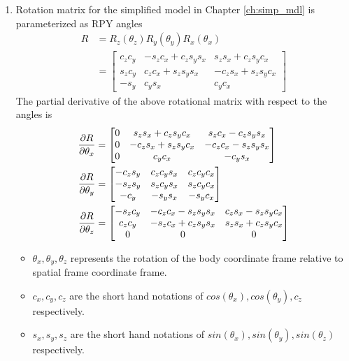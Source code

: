 \begin{enumerate}
\item Rotation matrix for the simplified model in Chapter \ref{ch:simp_mdl} is parameterized as RPY angles
\begin{equation}
	\label{eq:rot_simp}
	\begin{split}
		R &= R_z(\theta_z) R_y(\theta_y) R_x(\theta_x)\\ &=
		\begin{bmatrix}
		c_zc_y &-s_zc_x+c_zs_ys_x &s_zs_x+c_zs_yc_x\\
		s_zc_y &c_zc_x+s_zs_ys_x &-c_zs_x+s_zs_yc_x\\
		-s_y &c_ys_x &c_yc_x
		\end{bmatrix}
	\end{split}
\end{equation}
The partial derivative of the above rotational matrix with respect to the angles is
\begin{equation}
	\begin{split}	
		\frac{\partial {R}}{\partial {\theta_x}} &=
		\begin{bmatrix}
		0 &s_zs_x+c_zs_yc_x &s_zc_x-c_zs_ys_x \\
		0 &-c_zs_x+s_zs_yc_x &-c_zc_x-s_zs_ys_x \\
		0 &c_yc_x &-c_ys_x
		\end{bmatrix}\\
		\frac{\partial {R}}{\partial {\theta_y}} &=
		\begin{bmatrix}
		-c_zs_y &c_zc_ys_x &c_zc_yc_x \\
		-s_zs_y &s_zc_ys_x &s_zc_yc_x \\
		-c_y &-s_ys_x &-s_yc_x
		\end{bmatrix}\\
		\frac{\partial {R}}{\partial {\theta_z}} &=
		\begin{bmatrix}
		-s_zc_y &-c_zc_x-s_zs_ys_x &c_zs_x-s_zs_yc_x \\
		c_zc_y &-s_zc_x+c_zs_ys_x &s_zs_x+c_zs_yc_x\\
		0 &0 &0
		\end{bmatrix}
	\end{split}
\end{equation}
\begin{itemize}
\item $ \theta_x, \theta_y, \theta_z $ represents the rotation of the body coordinate frame relative to spatial frame coordinate frame.
\item $ c_x,c_y,c_z $ are the short hand notations of $cos(\theta_x), cos(\theta_y), c_z$ respectively.
\item $ s_x,s_y,s_z $ are the short hand notations of $sin(\theta_x), sin(\theta_y), sin(\theta_z)$ respectively.
\end{itemize}
\end{enumerate}
